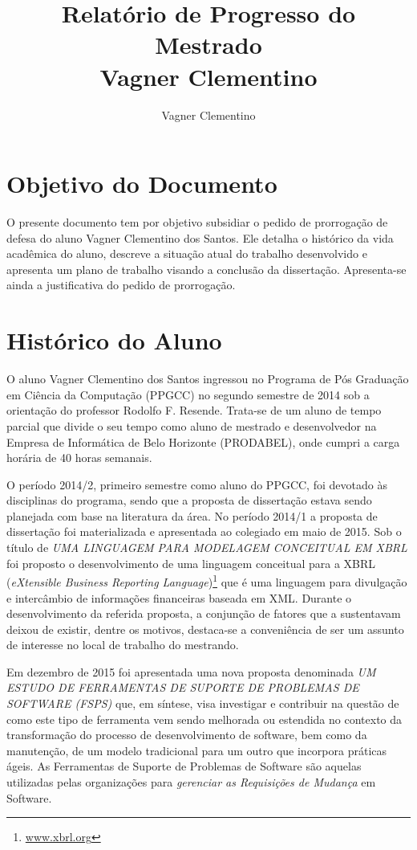 \documentclass[10pt,a4paper]{report}
\author{Vagner Clementino}
\title{Relatório de Progresso do Mestrado\\
	Vagner Clementino}
\begin{document}
\maketitle

	
\section{Objetivo do Documento}
\label{sec:objetivo}

O presente documento tem por objetivo subsidiar o pedido de prorrogação de defesa do aluno Vagner Clementino dos Santos. Ele detalha o histórico da vida acadêmica do aluno, descreve a situação atual do trabalho desenvolvido e apresenta um plano de trabalho visando a conclusão da dissertação.  Apresenta-se ainda a justificativa do pedido de prorrogação.

\section{Histórico do Aluno}
\label{sec:historico}

O aluno Vagner Clementino dos Santos ingressou no Programa de Pós Graduação em Ciência da Computação (PPGCC) no segundo semestre de 2014 sob a orientação do professor Rodolfo F. Resende. Trata-se de um aluno de tempo parcial que divide o seu tempo como aluno de mestrado e desenvolvedor na Empresa de Informática de Belo Horizonte (PRODABEL), onde cumpri a carga horária de 40 horas semanais. 

O período 2014/2, primeiro semestre como aluno do PPGCC, foi devotado às
disciplinas do programa, sendo que a proposta de dissertação estava sendo
planejada com base na literatura da área. No período 2014/1 a proposta de
dissertação foi materializada e apresentada ao colegiado em maio de 2015. Sob o
título de \textit{UMA LINGUAGEM PARA MODELAGEM CONCEITUAL EM XBRL} foi proposto
o desenvolvimento de uma linguagem conceitual para a XBRL (\textit{eXtensible
	Business Reporting Language})\footnote{\url{www.xbrl.org}} que é uma
linguagem para divulgação e intercâmbio de informações financeiras baseada em
XML\@. Durante o desenvolvimento da referida proposta, a conjunção de fatores que
a sustentavam deixou de existir, dentre os motivos, destaca-se a conveniência de
ser um assunto de interesse no local de trabalho do mestrando.

Em dezembro de 2015 foi apresentada uma nova proposta denominada  \textit{UM
	ESTUDO DE FERRAMENTAS DE SUPORTE DE PROBLEMAS DE SOFTWARE (FSPS)} que, em
síntese, visa investigar e contribuir na questão de como este tipo de ferramenta
vem sendo melhorada ou estendida no contexto da transformação do processo de
desenvolvimento de software, bem como da manutenção, de um modelo tradicional
para um outro que incorpora práticas ágeis. As Ferramentas de Suporte de
Problemas de Software são aquelas utilizadas pelas organizações para
\textit{gerenciar as Requisições de Mudança}\cite{1703974} em Software. 
\end{document}
